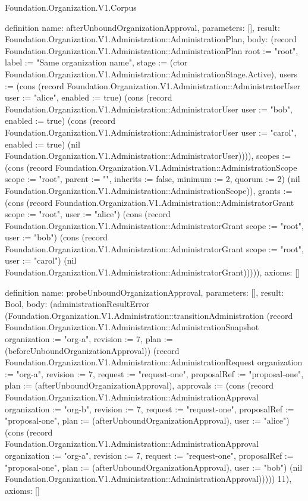 \begin{lexlean}{Foundation.Organization.V1.Corpus}
\begin{semanticmodule}
definition{
  name: afterUnboundOrganizationApproval,
  parameters: [],
  result: Foundation.Organization.V1.Administration::AdministrationPlan,
  body: (record Foundation.Organization.V1.Administration::AdministrationPlan {root := "root", label := "Same organization name", stage := (ctor Foundation.Organization.V1.Administration::AdministrationStage.Active), users := (cons (record Foundation.Organization.V1.Administration::AdministratorUser {user := "alice", enabled := true}) (cons (record Foundation.Organization.V1.Administration::AdministratorUser {user := "bob", enabled := true}) (cons (record Foundation.Organization.V1.Administration::AdministratorUser {user := "carol", enabled := true}) (nil Foundation.Organization.V1.Administration::AdministratorUser)))), scopes := (cons (record Foundation.Organization.V1.Administration::AdministrationScope {scope := "root", parent := "", inherits := false, minimum := 2, quorum := 2}) (nil Foundation.Organization.V1.Administration::AdministrationScope)), grants := (cons (record Foundation.Organization.V1.Administration::AdministratorGrant {scope := "root", user := "alice"}) (cons (record Foundation.Organization.V1.Administration::AdministratorGrant {scope := "root", user := "bob"}) (cons (record Foundation.Organization.V1.Administration::AdministratorGrant {scope := "root", user := "carol"}) (nil Foundation.Organization.V1.Administration::AdministratorGrant))))}),
  axioms: []
}

definition{
  name: probeUnboundOrganizationApproval,
  parameters: [],
  result: Bool,
  body: (administrationResultError (Foundation.Organization.V1.Administration::transitionAdministration (record Foundation.Organization.V1.Administration::AdministrationSnapshot {organization := "org-a", revision := 7, plan := (beforeUnboundOrganizationApproval)}) (record Foundation.Organization.V1.Administration::AdministrationRequest {organization := "org-a", revision := 7, request := "request-one", proposalRef := "proposal-one", plan := (afterUnboundOrganizationApproval), approvals := (cons (record Foundation.Organization.V1.Administration::AdministrationApproval {organization := "org-b", revision := 7, request := "request-one", proposalRef := "proposal-one", plan := (afterUnboundOrganizationApproval), user := "alice"}) (cons (record Foundation.Organization.V1.Administration::AdministrationApproval {organization := "org-a", revision := 7, request := "request-one", proposalRef := "proposal-one", plan := (afterUnboundOrganizationApproval), user := "bob"}) (nil Foundation.Organization.V1.Administration::AdministrationApproval)))})) 11),
  axioms: []
}


\end{semanticmodule}
\end{lexlean}

